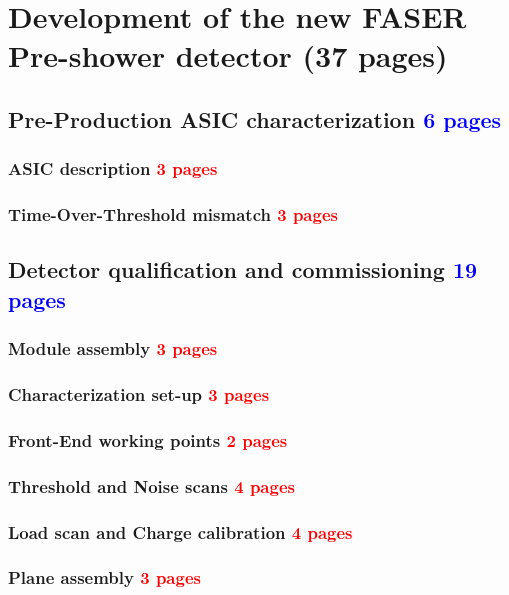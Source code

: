 \chapter{Development of the new FASER Pre-shower detector (37 pages)}
	\section{Pre-Production ASIC characterization \textcolor{blue}{ 6 pages}}
		\subsection{ASIC description \textcolor{red}{ 3 pages}} 
		\subsection{Time-Over-Threshold mismatch \textcolor{red}{ 3 pages}}
		
	\clearpage	
	\section{Detector qualification and commissioning \textcolor{blue}{ 19 pages}}
		\subsection{Module assembly \textcolor{red}{ 3 pages}}
		\subsection{Characterization set-up \textcolor{red}{ 3 pages}}
		\subsection{Front-End working points \textcolor{red}{ 2 pages}}
		\subsection{Threshold and Noise scans \textcolor{red}{ 4 pages}}
		\subsection{Load scan and Charge calibration \textcolor{red}{ 4 pages}} 
		\subsection{Plane assembly \textcolor{red}{ 3 pages}}
	
	\clearpage
